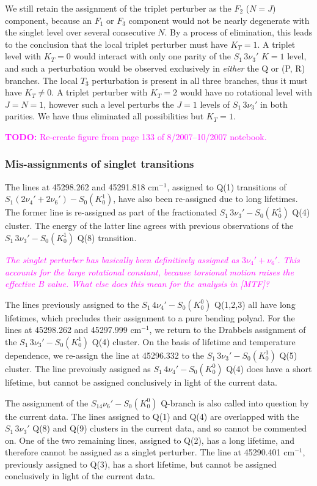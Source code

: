 \documentclass[12pt]{mitthesis}
\newcommand{\TODO} [1]{\textcolor{magenta}{\textbf{TODO:} #1}}
\newcommand{\POINT}[1]{\textcolor{magenta}{\emph{#1}}}
\newcommand{\rcm}{cm$^{-1}$}
\newcommand{\sing}{$S_1\,3\nu_3'$ }
\newcommand{\strans} {$S_1\,3\nu_3'-S_0(K_0^1)$ }
\newcommand{\fftrans}{$S_1\,4\nu_4'-S_0(K_0^0)$ }
\begin{document}
We still retain the assignment of the triplet perturber as the $F_2$
($N=J$) component, because an $F_1$ or $F_3$ component would not be
nearly degenerate with the singlet level over several consecutive $N$.
By a process of elimination, this leads to the conclusion that the
local triplet perturber must have $K_T=1$.  A triplet level with
$K_T=0$ would interact with only one parity of the \sing $K=1$ level,
and such a perturbation would be observed exclusively in \emph{either}
the Q or (P, R) branches.  The local $T_3$ perturbation is present in
all three branches, thus it must have $K_T\ne0$.  A triplet perturber
with $K_T=2$ would have no rotational level with $J=N=1$, however such
a level perturbs the $J=1$ levels of \sing in both parities.  We
have thus eliminated all possibilities but $K_T=1$.

\TODO{Re-create figure from page 133 of 8/2007--10/2007 notebook.}

\subsubsection{Mis-assignments of singlet transitions}

The lines at 45298.262 and 45291.818 \rcm, assigned to Q(1) transitions of
$S_1(2\nu_4' + 2\nu_6')-S_0(K^1_0)$, have also been re-assigned due to long
lifetimes.  The former line is re-assigned as part of the fractionated
\strans Q(4) cluster.  The energy of the latter line
agrees with previous observations of the \strans Q(8) transition.

\POINT{The singlet perturber has basically been definitively assigned
  as $3\nu_4'+\nu_6'$.  This accounts for the large rotational
  constant, because torsional motion raises the effective B value.
  What else does this mean for the analysis in [MTF]?}

The lines previously assigned to the \fftrans Q(1,2,3) all have long
lifetimes, which precludes their assignment to a pure bending polyad.
For the lines at 45298.262 and 45297.999 \rcm, we return to the
Drabbels assignment of the \strans Q(4) cluster.  On the basis of
lifetime and temperature dependence, we re-assign the line at
45296.332 to the \strans Q(5) cluster.  The line prevoiusly assigned
as \fftrans Q(4) does have a short lifetime, but cannot be assigned
conclusively in light of the current data.

The assignment of the $S_14\nu_6'-S_0(K_0^0)$ Q-branch is also called
into question by the current data.  The lines assigned to Q(1) and
Q(4) are overlapped with the \sing Q(8) and Q(9) clusters in the
current data, and so cannot be commented on.  One of the two remaining
lines, assigned to Q(2), has a long lifetime, and therefore cannot be
assigned as a singlet perturber.  The line at 45290.401 \rcm,
previously assigned to Q(3), has a short lifetime, but cannot be
assigned conclusively in light of the current data.
\end{document}
